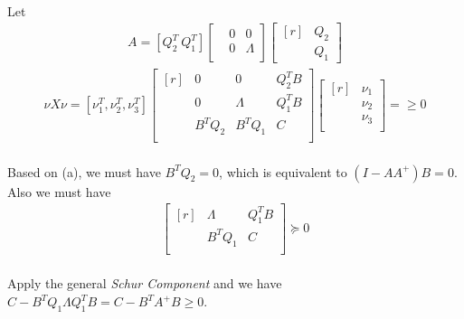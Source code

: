 \paragraph{}
Let
\begin{align*}
A = [Q^T_2\ Q^T_1]\begin{bmatrix}
&0 &0\\ &0 &\Lambda \\
\end{bmatrix}\begin{bmatrix*}[r]
&Q_2\\& Q_1
\end{bmatrix*}
\end{align*}
\begin{align*}
\nu X\nu =[\nu_1^T, \nu_2^T, \nu_3^T]\begin{bmatrix*}[r]
&0  &0 &Q_2^TB\\&0&\Lambda&Q_1^TB\\&B^TQ_2 &B^TQ_1 &C\\
\end{bmatrix*}\begin{bmatrix*}[r]
&\nu_1 \\&\nu_2\\& \nu_3\\ 
\end{bmatrix*}=  \geq 0
\end{align*}
\paragraph{}
Based on (a), we must have $B^TQ_2 = 0$, which is equivalent to $(I-AA^{+})B = 0$. Also we must have
\begin{align*}
\begin{bmatrix*}[r]
&\Lambda & Q_1^TB\\& B^TQ_1& C\\
\end{bmatrix*} \succeq 0
\end{align*}
\paragraph{}
Apply the general \textit{Schur Component} and we have $C - B^TQ_1\Lambda Q_1^TB = C - B^TA^+B \geq 0$.